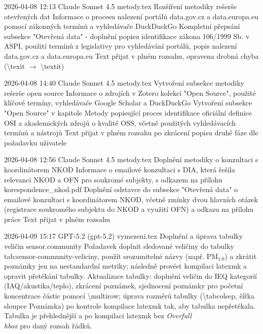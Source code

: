 
\logentry
  {2026-04-08 12:13}
  {Claude Sonnet 4.5}
  {metody.tex}
  {Rozšíření metodiky rešerše otevřených dat}
  {Informace o procesu nalezení portálů data.gov.cz a data.europa.eu pomocí zákonných termínů a vyhledávače DuckDuckGo}
  {Kompletní přepsání subsekce "Otevřená data" - doplnění popisu identifikace zákona 106/1999 Sb. v ASPI, použití termínů z legislativy pro vyhledávání portálů, popis nalezení data.gov.cz a data.europa.eu}
  {Text přijat v plném rozsahu, opravena drobná chyba (\textbackslash texit $\rightarrow$ \textbackslash textit)}

\logentry
  {2026-04-08 14:40}
  {Claude Sonnet 4.5}
  {metody.tex}
  {Vytvoření subsekce metodiky rešerše open source}
  {Informace o zdrojích v Zotero kolekci "Open Source", použité klíčové termíny, vyhledávače Google Scholar a DuckDuckGo}
  {Vytvoření subsekce "Open Source" v kapitole Metody popisující proces identifikace oficiální definice OSI a akademických zdrojů o kvalitě OSS, včetně použitých vyhledávacích termínů a nástrojů}
  {Text přijat v plném rozsahu po zkrácení popisu druhé fáze dle požadavku uživatele}

\logentry
  {2026-04-08 12:56}
  {Claude Sonnet 4.5}
  {metody.tex}
  {Doplnění metodiky o konzultaci s koordinátorem NKOD}
  {Informace o emailové konzultaci s DIA, která řešila relevanci NKOD a OFN pro soukromé subjekty, s odkazem na přílohu korespondence\_nkod.pdf}
  {Doplnění odstavce do subsekce "Otevřená data" o emailové konzultaci s koordinátorem NKOD, včetně zmínky dvou hlavních otázek (registrace soukromého subjektu do NKOD a využití OFN) a odkazu na přílohu práce}
  {Text přijat v plném rozsahu}

\logentry
  {2026-04-09 15:17}
  {GPT-5.2 (gpt-5.2)}
  {vymezeni.tex}
  {Doplnění a úprava tabulky veličin sensor.community}
  {Požadavek doplnit sledované veličiny do tabulky tab:sensor-community-veliciny, použít srozumitelné názvy (např. PM$_{1.0}$) a zkrátit poznámky jen na nestandardní metriky; následně provést kompilaci latexmk a opravit přetékání tabulky.}
  {Aktualizace tabulky: doplnění veličin do IEQ kategorií (IAQ/akustika/teplo), zkrácení poznámek, sjednocení poznámky pro početní koncentrace částic pomocí \textbackslash multirow; úprava rozměrů tabulky (\textbackslash tabcolsep, šířka sloupce Poznámka) po kontrole kompilace latexmk tak, aby tabulka nepřetékala.}
  {Tabulka je přehlednější a po kompilaci latexmk bez \textit{Overfull \\hbox} pro daný rozsah řádků.}

